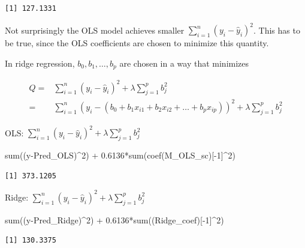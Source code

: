 \documentclass[
  letterpaper,
  DIV=11,
  numbers=noendperiod]{scrreprt}
\newenvironment{Shaded}{\begin{snugshade}}{\end{snugshade}}
\newcommand{\DecValTok}[1]{\textcolor[rgb]{0.68,0.00,0.00}{#1}}
\newcommand{\FloatTok}[1]{\textcolor[rgb]{0.68,0.00,0.00}{#1}}
\newcommand{\FunctionTok}[1]{\textcolor[rgb]{0.28,0.35,0.67}{#1}}
\newcommand{\NormalTok}[1]{\textcolor[rgb]{0.00,0.23,0.31}{#1}}
\newcommand{\SpecialCharTok}[1]{\textcolor[rgb]{0.37,0.37,0.37}{#1}}
\begin{document}
\begin{verbatim}
[1] 127.1331
\end{verbatim}

Not surprisingly the OLS model achieves smaller
\(\displaystyle\sum_{i=1}^n (y_i -\hat{y}_i)^2\). This has to be true,
since the OLS coefficients are chosen to minimize this quantity.

In ridge regression, \(b_0, b_1, \ldots, b_p\) are chosen in a way that
minimizes

\[
\begin{aligned}
Q=& \displaystyle\sum_{i=1}^n (y_i -\hat{y}_i)^2  + \lambda\displaystyle\sum_{j=1}^pb_j^2\\ =  & \displaystyle\sum_{i=1}^n (y_i -(b_0 + b_1x_{i1} + b_2x_{i2} + \ldots + b_px_{ip}))^2 + \lambda\displaystyle\sum_{j=1}^pb_j^2
\end{aligned}
\]

OLS:
\(\displaystyle\sum_{i=1}^n (y_i -\hat{y}_i)^2  + \lambda\displaystyle\sum_{j=1}^pb_j^2\)

\begin{Shaded}
\begin{Highlighting}[]
\FunctionTok{sum}\NormalTok{((y}\SpecialCharTok{{-}}\NormalTok{Pred\_OLS)}\SpecialCharTok{\^{}}\DecValTok{2}\NormalTok{) }\SpecialCharTok{+} \FloatTok{0.6136}\SpecialCharTok{*}\FunctionTok{sum}\NormalTok{(}\FunctionTok{coef}\NormalTok{(M\_OLS\_sc)[}\SpecialCharTok{{-}}\DecValTok{1}\NormalTok{]}\SpecialCharTok{\^{}}\DecValTok{2}\NormalTok{) }
\end{Highlighting}
\end{Shaded}

\begin{verbatim}
[1] 373.1205
\end{verbatim}

Ridge:
\(\displaystyle\sum_{i=1}^n (y_i -\hat{y}_i)^2  + \lambda\displaystyle\sum_{j=1}^pb_j^2\)

\begin{Shaded}
\begin{Highlighting}[]
\FunctionTok{sum}\NormalTok{((y}\SpecialCharTok{{-}}\NormalTok{Pred\_Ridge)}\SpecialCharTok{\^{}}\DecValTok{2}\NormalTok{) }\SpecialCharTok{+} \FloatTok{0.6136}\SpecialCharTok{*}\FunctionTok{sum}\NormalTok{((Ridge\_coef)[}\SpecialCharTok{{-}}\DecValTok{1}\NormalTok{]}\SpecialCharTok{\^{}}\DecValTok{2}\NormalTok{)}
\end{Highlighting}
\end{Shaded}

\begin{verbatim}
[1] 130.3375
\end{verbatim}
\end{document}

